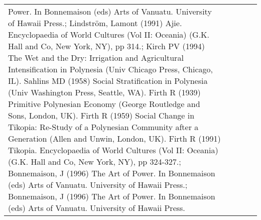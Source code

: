 \begin{longtable}{p{2cm}p{2cm}p{2cm}p{5cm}p{7cm}}
Power. In Bonnemaison (eds) Arts of Vanuatu. University of Hawaii Press.; Lindström, Lamont (1991) Ajie. Encyclopaedia of World Cultures (Vol II: Oceania) (G.K. Hall and Co, New York, NY), pp 314.; Kirch PV (1994) The Wet and the Dry: Irrigation and Agricultural Intensification in Polynesia (Univ Chicago Press, Chicago, IL). Sahlins MD (1958) Social Stratification in Polynesia (Univ Washington Press, Seattle, WA). Firth R (1939) Primitive Polynesian Economy (George Routledge and Sons, London, UK). Firth R (1959) Social Change in Tikopia: Re-Study of a Polynesian Community after a Generation (Allen and Unwin, London, UK). Firth R (1991) Tikopia. Encyclopaedia of World Cultures (Vol II: Oceania) (G.K. Hall and Co, New York, NY), pp 324-327.; Bonnemaison, J (1996) The Art of Power. In Bonnemaison (eds) Arts of Vanuatu. University of Hawaii Press.; Bonnemaison, J (1996) The Art of Power. In Bonnemaison (eds) Arts of Vanuatu. University of Hawaii Press. \\ 

\end{longtable}
